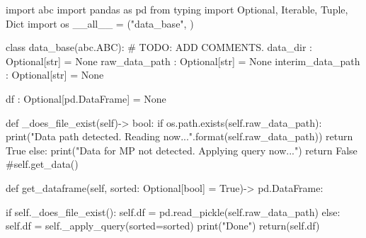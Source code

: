 import abc
import pandas as pd
from typing import Optional, Iterable, Tuple, Dict
import os
__all__ = ("data_base", )

class data_base(abc.ABC):
    # TODO: ADD COMMENTS.
    data_dir :          Optional[str] = None
    raw_data_path :     Optional[str] = None
    interim_data_path : Optional[str] = None

    df :       Optional[pd.DataFrame] = None

    def _does_file_exist(self)-> bool:
        if os.path.exists(self.raw_data_path):
            print("Data path {} detected. Reading now...".format(self.raw_data_path))
            return True
        else:
            print("Data for MP not detected. Applying query now...")
            return False #self.get_data()

    def get_dataframe(self, sorted: Optional[bool] = True)-> pd.DataFrame:

        if self._does_file_exist():
            self.df = pd.read_pickle(self.raw_data_path)
        else:
            self.df = self._apply_query(sorted=sorted)
        print("Done")
        return(self.df)
